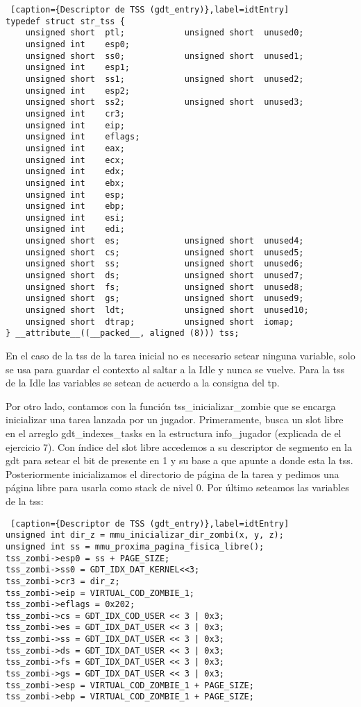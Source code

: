 \begin{lstlisting} [caption={Descriptor de TSS (gdt_entry)},label=idtEntry]
typedef struct str_tss {
    unsigned short  ptl;            unsigned short  unused0;
    unsigned int    esp0;
    unsigned short  ss0;            unsigned short  unused1;
    unsigned int    esp1;
    unsigned short  ss1;            unsigned short  unused2;
    unsigned int    esp2;
    unsigned short  ss2;            unsigned short  unused3;
    unsigned int    cr3;
    unsigned int    eip;
    unsigned int    eflags;
    unsigned int    eax;
    unsigned int    ecx;
    unsigned int    edx;
    unsigned int    ebx;
    unsigned int    esp;
    unsigned int    ebp;
    unsigned int    esi;
    unsigned int    edi;
    unsigned short  es;             unsigned short  unused4;
    unsigned short  cs;             unsigned short  unused5;
    unsigned short  ss;             unsigned short  unused6;
    unsigned short  ds;             unsigned short  unused7;
    unsigned short  fs;             unsigned short  unused8;
    unsigned short  gs;             unsigned short  unused9;
    unsigned short  ldt;            unsigned short  unused10;
    unsigned short  dtrap;          unsigned short  iomap;
} __attribute__((__packed__, aligned (8))) tss;
\end{lstlisting}

\par{En el caso de la tss de la tarea inicial no es necesario setear ninguna variable, solo se usa para guardar el contexto al saltar a la Idle y nunca se vuelve. Para la tss de la Idle las variables se setean de acuerdo a la consigna del tp.}
\par{Por otro lado, contamos con la funci\'on tss_inicializar_zombie que se encarga inicializar una tarea lanzada por un jugador. Primeramente, busca un slot libre en el arreglo gdt_indexes_tasks en la estructura info_jugador (explicada de el ejercicio 7). Con \'indice del slot libre accedemos a su descriptor de segmento en la gdt para setear el bit de presente en 1 y su base a que apunte a donde esta la tss. Posteriormente inicializamos el directorio de p\'agina de la tarea y pedimos una p\'agina libre para usarla como stack de nivel 0. Por \'ultimo seteamos las variables de la tss:}

\begin{lstlisting} [caption={Descriptor de TSS (gdt_entry)},label=idtEntry]
unsigned int dir_z = mmu_inicializar_dir_zombi(x, y, z);
unsigned int ss = mmu_proxima_pagina_fisica_libre();
tss_zombi->esp0 = ss + PAGE_SIZE;
tss_zombi->ss0 = GDT_IDX_DAT_KERNEL<<3;
tss_zombi->cr3 = dir_z;
tss_zombi->eip = VIRTUAL_COD_ZOMBIE_1;
tss_zombi->eflags = 0x202;
tss_zombi->cs = GDT_IDX_COD_USER << 3 | 0x3;
tss_zombi->es = GDT_IDX_DAT_USER << 3 | 0x3;
tss_zombi->ss = GDT_IDX_DAT_USER << 3 | 0x3;
tss_zombi->ds = GDT_IDX_DAT_USER << 3 | 0x3;
tss_zombi->fs = GDT_IDX_DAT_USER << 3 | 0x3;
tss_zombi->gs = GDT_IDX_DAT_USER << 3 | 0x3;
tss_zombi->esp = VIRTUAL_COD_ZOMBIE_1 + PAGE_SIZE;
tss_zombi->ebp = VIRTUAL_COD_ZOMBIE_1 + PAGE_SIZE;
\end{lstlisting}

